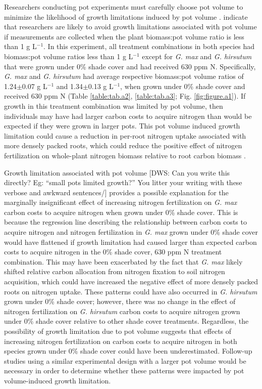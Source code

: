 Researchers conducting pot experiments must carefully choose pot volume to minimize the likelihood of growth limitations induced by pot volume .  indicate that researchers are likely to avoid growth limitations associated with pot volume if measurements are collected when the plant biomass:pot volume ratio is less than 1 g L$^{-1}$. In this experiment, all treatment combinations in both species had biomass:pot volume ratios less than 1 g L$^{-1}$ except for \textit{G. max} and \textit{G. hirsutum} that were grown under 0\% shade cover and had received 630 ppm N. Specifically, \textit{G. max} and \textit{G. hirsutum} had average respective biomass:pot volume ratios of 1.24$\pm$0.07 g L$^{-1}$ and 1.34$\pm$0.13 g L$^{-1}$, when grown under 0\% shade cover and received 630 ppm N (Table \ref{table:tab.a2}, \ref{table:tab.a3}; Fig. \ref{fig:figure.a1}). If growth in this treatment combination was limited by pot volume, then individuals may have had larger carbon costs to acquire nitrogen than would be expected if they were grown in larger pots. This pot volume induced growth limitation could cause a reduction in per-root nitrogen uptake associated with more densely packed roots, which could reduce the positive effect of nitrogen fertilization on whole-plant nitrogen biomass relative to root carbon biomass .

Growth limitation associated with pot volume [DWS: Can you write this directly? Eg: ``small pots limited growth?'' You litter your writing with these verbose and awkward sentences/]  provides a possible explanation for the marginally insignificant effect of increasing nitrogen fertilization on \textit{G. max} carbon costs to acquire nitrogen when grown under 0\% shade cover. This is because the regression line describing the relationship between carbon costs to acquire nitrogen and nitrogen fertilization in \textit{G. max} grown under 0\% shade cover would have flattened if growth limitation had caused larger than expected carbon costs to acquire nitrogen in the 0\% shade cover, 630 ppm N treatment combination. This may have been exacerbated by the fact that \textit{G. max} likely shifted relative carbon allocation from nitrogen fixation to soil nitrogen acquisition, which could have increased the negative effect of more densely packed roots on nitrogen uptake. These patterns could have also occurred in \textit{G. hirsutum} grown under 0\% shade cover; however, there was no change in the effect of nitrogen fertilization on \textit{G. hirsutum} carbon costs to acquire nitrogen grown under 0\% shade cover relative to other shade cover treatments. Regardless, the possibility of growth limitation due to pot volume suggests that effects of increasing nitrogen fertilization on carbon costs to acquire nitrogen in both species grown under 0\% shade cover could have been underestimated. Follow-up studies using a similar experimental design with a larger pot volume would be necessary in order to determine whether these patterns were impacted by pot volume-induced growth limitation.

